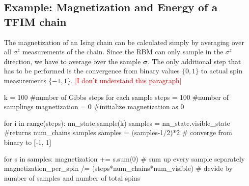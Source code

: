 \documentclass[submission, Phys]{SciPost}
\begin{document}
\subsection{Example: Magnetization and Energy of a TFIM chain}

The magnetization of an Ising chain can be calculated simply by averaging over all $\sigma^z$ measurements of the chain. 
Since the RBM can only sample in the $\sigma^z$ direction, we have to average over the sample $\bm{\sigma}$. The only additional step that has to be performed is the convergence from binary values $\{0,1  \}$ to actual spin measurements $\{-1 ,1  \}$. \textcolor{red}{[I don't understand this paragraph]}

\begin{python}
k = 100 #number of Gibbs steps for each sample
steps = 100 #number of samplings
magnetization = 0 #initialize magnetization as 0

for i in range(steps):
	nn_state.sample(k)
	samples = nn_state.visible_state #returns num_chains samples
	samples = (samples-1/2)*2 # converge from binary to [-1, 1]

	for s in samples: 
		magnetization += s.sum(0) # sum up every sample separately
magnetization_per_spin /= (steps*num_chains*num_visible) # devide by number of samples and number of total spins
\end{python}

\end{document}
